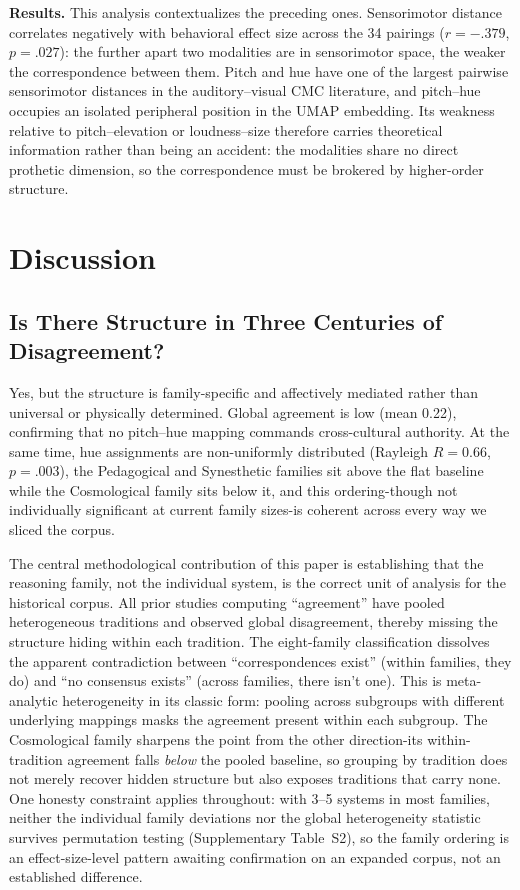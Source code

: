 \documentclass[12pt]{article}
\begin{document}
\textbf{Results.} This analysis contextualizes the preceding ones.
Sensorimotor
distance correlates negatively with behavioral effect size across the
34 pairings ($r = -.379$, $p = .027$): the further apart two modalities
are in sensorimotor space, the weaker the correspondence between them.
Pitch and hue have one of the largest pairwise sensorimotor distances
in the auditory--visual CMC literature, and pitch--hue occupies an
isolated peripheral position in the UMAP embedding. Its weakness
relative to pitch--elevation or loudness--size therefore carries
theoretical information rather than being an accident: the modalities
share no direct prothetic dimension, so the correspondence must be
brokered by higher-order structure.

\section{Discussion}

\subsection{Is There Structure in Three Centuries of Disagreement?}

Yes, but the structure is family-specific and affectively mediated
rather than universal or physically determined. Global agreement is low
(mean 0.22), confirming that no pitch--hue mapping commands
cross-cultural authority. At the same time, hue assignments are
non-uniformly distributed (Rayleigh $R = 0.66$, $p = .003$), the
Pedagogical and Synesthetic families sit above the flat baseline while
the Cosmological family sits below it, and this ordering-though not
individually significant at current family sizes-is coherent across
every way we sliced the corpus.

The central methodological contribution of this paper is establishing
that the reasoning family, not the individual system, is the correct
unit of analysis for the historical corpus. All prior studies computing
``agreement'' have pooled heterogeneous traditions and observed global
disagreement, thereby missing the structure hiding within each tradition.
The eight-family classification dissolves the apparent contradiction
between ``correspondences exist'' (within families, they do) and ``no
consensus exists'' (across families, there isn't one). This is
meta-analytic heterogeneity in its
classic form: pooling across subgroups with different underlying
mappings masks the agreement present within each subgroup. The
Cosmological family sharpens the point from the other direction-its
within-tradition agreement falls \emph{below} the pooled baseline, so
grouping by tradition does not merely recover hidden structure but
also exposes traditions that carry none. One honesty constraint
applies throughout: with 3--5 systems in most families, neither the
individual family deviations nor the global heterogeneity statistic
survives permutation testing (Supplementary Table~S2), so the family
ordering is an effect-size-level pattern awaiting confirmation on an
expanded corpus, not an established difference.
\end{document}
